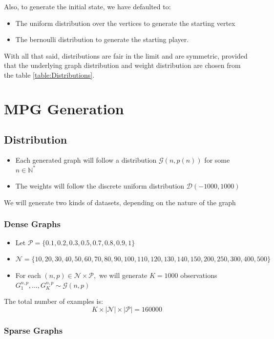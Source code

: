 \FloatBarrier
Also, to generate the initial state, we have defaulted to:
\begin{itemize}
	\item The uniform distribution over the vertices to generate the starting vertex
	\item The bernoulli distribution to generate the starting player.
\end{itemize}
With all that said, distributions are fair in the limit and are symmetric, provided that the underlying graph distribution and weight distribution are chosen from the table \ref{table:Distributions}.

\section{MPG Generation}
\label{section:MPG:Generation}
\subsection{Distribution}
\label{section:MPG:Generation:Distribution}
\begin{itemize}
	\item Each generated graph will follow a distribution $\mathcal{G}(n,p(n))$  for some $n\in\mathbb{N}^*$
	\item The weights will follow the discrete uniform distribution $\mathcal{D}(-1000,1000)$

\end{itemize}

We will generate two kinds of datasets, depending on the nature of the graph

\subsubsection{Dense Graphs}
\begin{itemize}
	\item Let $\mathcal{P}=\{0.1,0.2,0.3,0.5,0.7,0.8,0.9,1\}$
	\item $\mathcal{N}=\{10,20,30,40,50,60,70,80,90,100,110,120,130,140,150,200,250,300,400,500\}$
	\item For each $(n,p)\in \mathcal{N}\times \mathcal{P},$ we will generate $K=1000$ observations $G^{n,p}_1,\dots,G^{n,p}_{K} \sim \mathcal{G}(n,p)$ 
\end{itemize} 

The total number of examples is:
$$
K\times\lvert \mathcal{N} \rvert \times \lvert \mathcal{P}\rvert=160000
$$
\subsubsection{Sparse Graphs}
